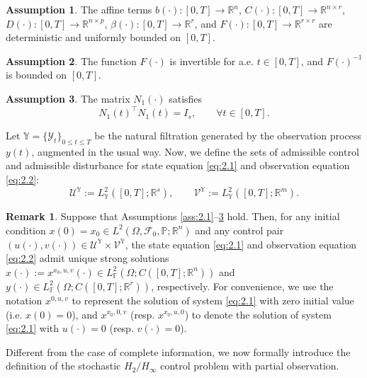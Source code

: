 \documentclass[lettersize,journal]{IEEEtran}
\theoremstyle{plain}
\theoremstyle{definition}
\newtheorem{ass}{Assumption}
\newtheorem{rmk}[thm]{Remark}
\begin{document}
\begin{ass}\label{ass:2.2}
	The affine terms $b(\cdot) : [0,T] \rightarrow \mathbb{R}^{n}$, $C(\cdot) : [0,T] \rightarrow \mathbb{R}^{n \times r}$, $D(\cdot) : [0,T] \rightarrow \mathbb{R}^{n \times p}$, $\beta(\cdot) : [0,T] \rightarrow \mathbb{R}^{r}$, and $F(\cdot) : [0,T] \rightarrow \mathbb{R}^{r \times r}$ are deterministic and uniformly bounded on $[0,T]$.
\end{ass}

\begin{ass}\label{ass:2.3}
	The function $F(\cdot)$ is invertible for a.e. $t \in [0,T]$, and $F(\cdot)^{-1}$ is bounded on $[0,T]$.
\end{ass}

\begin{ass}\label{ass:2.4}
	The matrix $N_1(\cdot)$ satisfies
	\[
	N_1(t)^{\top}N_1(t) = I_s,\qquad \forall t \in [0,T].
	\]
\end{ass}

Let $\mathbb{Y} = \{\mathcal{Y}_t\}_{0 \le t \le T}$ be the natural filtration generated by the observation process $y(t)$, augmented in the usual way. Now, we define the sets of admissible control and admissible disturbance for state equation \eqref{eq:2.1} and observation equation \eqref{eq:2.2}:
\begin{equation*}
	\mathcal{U}^{\mathbb{Y}}:= L_{\mathbb{Y}}^2([0,T];\mathbb{R}^s),
	\qquad
	\mathcal{V}^{\mathbb{Y}}:= L_{\mathbb{Y}}^2([0,T];\mathbb{R}^m).
\end{equation*}

\begin{rmk}\label{rmk:2.1}
	Suppose that Assumptions \ref{ass:2.1}--\ref{ass:2.4} hold. Then, for any initial condition $x(0) = x_0 \in L^2(\Omega,\mathcal{F}_0,\mathbb{P};\mathbb{R}^n)$ and any control pair $(u(\cdot),v(\cdot)) \in \mathcal{U}^{\mathbb{Y}} \times \mathcal{V}^{\mathbb{Y}}$, the state equation \eqref{eq:2.1} and observation equation \eqref{eq:2.2} admit unique strong solutions $x(\cdot) := x^{x_0,u,v}(\cdot) \in L_{\mathbb{F}}^2(\Omega;C([0,T];\mathbb{R}^n))$ and $y(\cdot) \in L_{\mathbb{F}}^2(\Omega;C([0,T];\mathbb{R}^r))$, respectively. For convenience, we use the notation $x^{0,u,v}$ to represent the solution of system \eqref{eq:2.1} with zero initial value (i.e. $x(0) = 0$), and $x^{x_0,0,v}$ (resp. $x^{x_0,u,0}$) to denote the solution of system \eqref{eq:2.1} with $u(\cdot)=0$ (resp. $v(\cdot)=0$).
\end{rmk}

Different from the case of complete information, we now formally introduce the definition of the stochastic $H_2/H_\infty$ control problem with partial observation.
\end{document}
